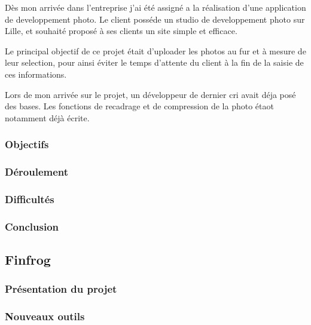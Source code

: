 \bigskip

Dès mon arrivée dans l'entreprise j'ai été assigné a la réalisation
d'une application de developpement photo. Le client posséde un studio de
developpement photo sur Lille, et souhaité proposé à ses clients un site
simple et efficace.

\bigskip

Le principal objectif de ce projet était d'uploader les photos au fur et
à mesure de leur selection, pour ainsi éviter le temps d'attente du
client à la fin de la saisie de ces informations.

\bigskip

Lors de mon arrivée sur le projet, un développeur de dernier cri avait
déja posé des bases. Les fonctions de recadrage et de compression de la
photo étaot notamment déjà écrite.

\bigskip

\subsubsection{Objectifs}\label{objectifs}

\subsubsection{Déroulement}\label{duxe9roulement}

\subsubsection{Difficultés}\label{difficultuxe9s}

\subsubsection{Conclusion}\label{conclusion}

\subsection{Finfrog}\label{finfrog}

\subsubsection{Présentation du
projet}\label{pruxe9sentation-du-projet-1}

\subsubsection{Nouveaux outils}\label{nouveaux-outils}

